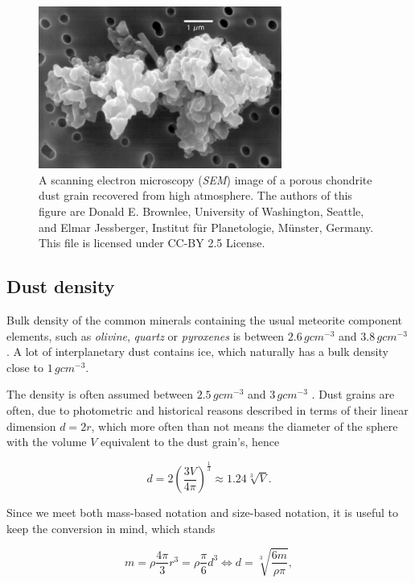 \begin{figure}[h]
 	\centering
 	\includegraphics[width=8cm]{figures/grain.jpg}
 	\caption{A scanning electron microscopy (\textit{SEM}) image of a porous chondrite dust grain recovered from high atmosphere.  The authors of this figure are Donald E. Brownlee, University of Washington, Seattle, and Elmar Jessberger, Institut für Planetologie, Münster, Germany.
This file is licensed under CC-BY 2.5 License.}
 	\label{fig:dust_grain}
\end{figure}

\subsection{Dust density} \label{sec:density}

Bulk density of the common minerals containing the usual meteorite component elements, such as \textit{olivine}, \textit{quartz} or \textit{pyroxenes} is between $2.6 \, \si{g cm^{-3}}$ and $3.8 \, \si{g cm^{-3}}$ \citep{duda1986minerals}. A lot of interplanetary dust contains ice, which naturally has a bulk density close to $1 \, \si{g cm^{-3}}$.

The density is often assumed between $2.5 \, \si{g cm^{-3}}$ \citep{mann2014dust} and $3 \, \si{g cm^{-3}}$ \citep{mcdonnell1984cosmic}. Dust grains are often, due to photometric and historical reasons described in terms of their linear dimension $d = 2r$, which more often than not means the diameter of the sphere with the volume $V$ equivalent to the dust grain's, hence

\begin{equation}
    d = 2 \left( {\frac{3V}{4\pi}} \right)^{\frac{1}{3}} \approx 1.24 \sqrt[3]{V}.
\end{equation}

Since we meet both mass-based notation and size-based notation, it is useful to keep the conversion in mind, which stands

\begin{equation}
    m = \rho \frac{4\pi}{3} r^3 = \rho \frac{\pi}{6} d^3 \Leftrightarrow d = \sqrt[3]{\frac{6 m}{\rho \pi}},
    \label{eq:density}
\end{equation}

